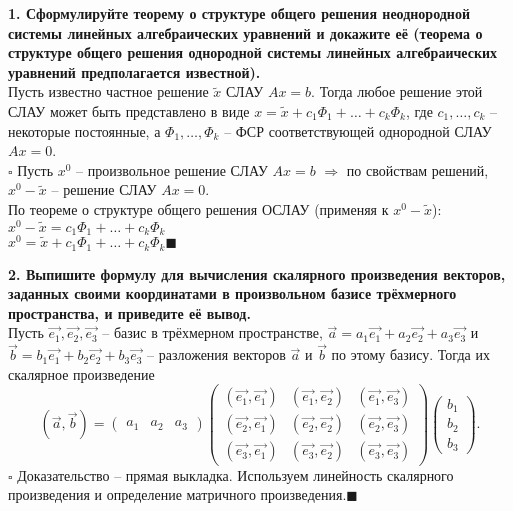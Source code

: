 \documentclass[11pt,a4paper]{article}
\newcommand{\vect}[1]{\overrightarrow{#1}}
\newcommand{\proof}{$\square$ }
\newcommand{\qed}{\hfill$\blacksquare$}
\begin{document}
\textbf{1. Сформулируйте теорему о структуре общего решения неоднородной системы линейных алгебраических уравнений и докажите её (теорема о структуре общего решения однородной системы линейных алгебраических уравнений предполагается известной).\\}
Пусть известно частное решение $\tilde{x}$ СЛАУ $Ax = b$. Тогда любое решение этой СЛАУ может быть представлено в виде $x = \tilde{x} + c_1 \Phi_1 + \hdots + c_k \Phi_k$, где $c_1, \hdots, c_k$ -- некоторые постоянные, а $\Phi_1, \hdots, \Phi_k$ -- ФСР соответствующей однородной СЛАУ $Ax = 0$.\\
\proof Пусть $x^0$ -- произвольное решение СЛАУ $Ax = b$ $\Rightarrow$ по свойствам решений, $x^0 - \tilde{x}$ -- решение СЛАУ $Ax = 0$.\\
По теореме о структуре общего решения ОСЛАУ (применяя к $x^0 - \tilde{x}$):\\
$x^0 - \tilde{x} = c_1 \Phi_1 + \hdots + c_k \Phi_k$\\
$x^0 = \tilde{x} + c_1 \Phi_1 + \hdots + c_k \Phi_k$\qed

\textbf{2. Выпишите формулу для вычисления скалярного произведения векторов, заданных своими координатами в произвольном базисе трёхмерного пространства, и приведите её вывод.\\}
Пусть $\vect{e_1}, \vect{e_2}, \vect{e_3}$ -- базис в трёхмерном пространстве, $\vect{a} = a_1 \vect{e_1} + a_2 \vect{e_2} + a_3 \vect{e_3}$ и $\vect{b} = b_1 \vect{e_1} + b_2 \vect{e_2} + b_3 \vect{e_3}$ -- разложения векторов $\vect{a}$ и $\vect{b}$ по этому базису. Тогда их скалярное произведение
$$\left( \vect{a}, \vect{b} \right) =
\left( \begin{matrix}
a_1 & a_2 & a_3
\end{matrix} \right)
\left( \begin{matrix}
\left( \vect{e_1}, \vect{e_1} \right) & \left( \vect{e_1}, \vect{e_2} \right) & \left( \vect{e_1}, \vect{e_3} \right)\\
\left( \vect{e_2}, \vect{e_1} \right) & \left( \vect{e_2}, \vect{e_2} \right) & \left( \vect{e_2}, \vect{e_3} \right) \\
\left( \vect{e_3}, \vect{e_1} \right) & \left( \vect{e_3}, \vect{e_2} \right) & \left( \vect{e_3}, \vect{e_3} \right)
\end{matrix} \right)
\left( \begin{matrix}
b_1 \\
b_2 \\
b_3
\end{matrix} \right).$$
\proof Доказательство -- прямая выкладка. Используем линейность скалярного произведения и определение матричного произведения.\qed
\end{document}
